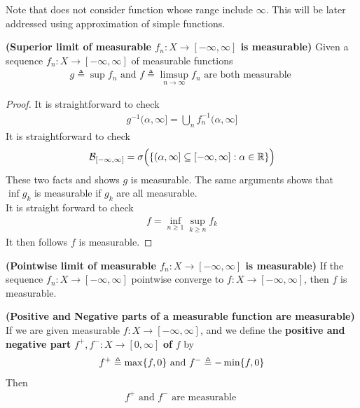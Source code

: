 \documentclass{report}
\begin{document}
\begin{mdframed}
Note that  does not consider function whose range include $\infty$. This will be later addressed using approximation of simple functions.
\end{mdframed}
\begin{theorem}
\label{Slm}
\textbf{(Superior limit of measurable $f_n:X\rightarrow [-\infty,\infty]$ is measurable)} Given a sequence $f_n:X\rightarrow [-\infty, \infty]$ of measurable functions
\begin{align*}
g\triangleq \sup f_n \text{ and }f\triangleq \limsup_{n\to\infty} f_n\text{ are both measurable }
\end{align*}
\end{theorem}
\begin{proof}
It is straightforward to check 
\begin{align*}
  g^{-1}(\alpha ,\infty] = \bigcup_n f_n^{-1} (\alpha ,\infty]
\end{align*}
It is straightforward to check
\begin{align*}
  \mathcal{B}_{[-\infty,\infty]}=\sigma \Big( \{ (\alpha ,\infty] \subseteq [-\infty,\infty]: \alpha \in\mathbb{R} \} \Big)
\end{align*}
These two facts and  shows $g$ is measurable. The same arguments shows that $\inf g_k$ is measurable if $g_k$  are all measurable.\\

It is straight forward to check 
\begin{align*}
f= \inf_{n\geq 1} \sup_{k\geq n} f_k
\end{align*}
It then follows $f$ is measurable.
\end{proof}
\begin{corollary}
\label{Plm}
\textbf{(Pointwise limit of measurable $f_n:X\rightarrow [-\infty,\infty]$ is measurable)} If the sequence $f_n:X\rightarrow [-\infty,\infty]$ pointwise converge to $f:X\rightarrow [-\infty,\infty]$,  then $f$ is measurable. 
\end{corollary}
\begin{corollary}
\label{PaN}
\textbf{(Positive and Negative parts of a measurable function are measurable)} If we are given measurable $f:X\rightarrow [-\infty,\infty]$, and we define the \textbf{positive and negative part} $f^+,f^-:X\rightarrow [0,\infty]$ \textbf{of} $f$ by 
\begin{align*}
f^+\triangleq \max \{ f,0 \}\text{ and }f^- \triangleq -\min \{ f,0 \}
\end{align*}
Then 
\begin{align*}
f^+\text{ and }f^-\text{ are measurable }
\end{align*}
\end{corollary}
\end{document}
